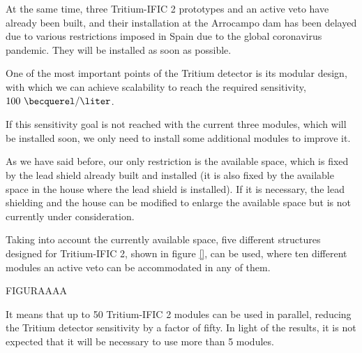 At the same time, three Tritium-IFIC 2 prototypes and an active veto have already been built, and their installation at the Arrocampo dam has been delayed due to various restrictions imposed in Spain due to the global coronavirus pandemic. They will be installed as soon as possible.

One of the most important points of the Tritium detector is its modular design, with which we can achieve scalability to reach the required sensitivity, $100~\becquerel/\liter$. 

If this sensitivity goal is not reached with the current three modules, which will be installed soon, we only need to install some additional modules to improve it.

As we have said before, our only restriction is the available space, which is fixed by the lead shield already built and installed (it is also fixed by the available space in the house where the lead shield is installed). If it is necessary, the lead shielding and the house can be modified to enlarge the available space but is not currently under consideration.

Taking into account the currently available space, five different structures designed for Tritium-IFIC 2, shown in figure \ref{}, can be used, where ten different modules an active veto can be accommodated in any of them. 

FIGURAAAA

It means that up to 50 Tritium-IFIC 2 modules can be used in parallel, reducing the Tritium detector sensitivity by a factor of fifty. In light of the results, it is not expected that it will be necessary to use more than 5 modules.